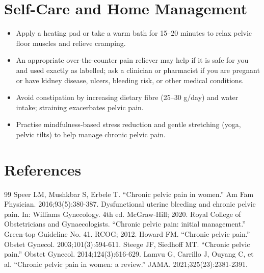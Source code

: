 \section*{Self-Care and Home Management}
\begin{itemize}
  \item Apply a heating pad or take a warm bath for 15--20 minutes to relax pelvic floor muscles and relieve cramping.
  \item An appropriate over-the-counter pain reliever may help if it is safe for you and used exactly as labelled; ask a clinician or pharmacist if you are pregnant or have kidney disease, ulcers, bleeding risk, or other medical conditions.
  \item Avoid constipation by increasing dietary fibre (25--30 g/day) and water intake; straining exacerbates pelvic pain.
  \item Practise mindfulness-based stress reduction and gentle stretching (yoga, pelvic tilts) to help manage chronic pelvic pain.
\end{itemize}

\section*{References}
\begin{thebibliography}{99}
 Speer LM, Mushkbar S, Erbele T. ``Chronic pelvic pain in women.'' Am Fam Physician. 2016;93(5):380-387.
 Dysfunctional uterine bleeding and chronic pelvic pain. In: Williams Gynecology. 4th ed. McGraw-Hill; 2020.
 Royal College of Obstetricians and Gynaecologists. ``Chronic pelvic pain: initial management.'' Green-top Guideline No. 41. RCOG; 2012.
 Howard FM. ``Chronic pelvic pain.'' Obstet Gynecol. 2003;101(3):594-611.
 Steege JF, Siedhoff MT. ``Chronic pelvic pain.'' Obstet Gynecol. 2014;124(3):616-629.
 Lamvu G, Carrillo J, Ouyang C, et al. ``Chronic pelvic pain in women: a review.'' JAMA. 2021;325(23):2381-2391.
\end{thebibliography}
